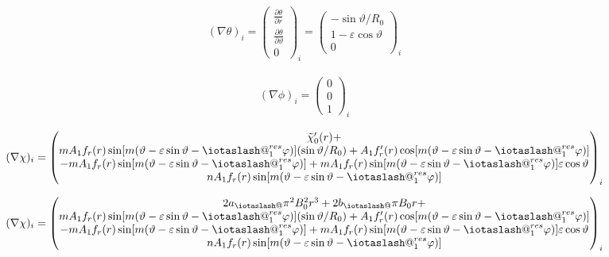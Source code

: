 \documentclass[11pt,a4paper,oneside]{article}
\makeatletter
\newcommand{\iotaslash}{{\mathpalette\iotaslash@\relax}}
\newcommand{\iotaslash@}[2]{
  \raisebox{-0.6\height}[0pt][0pt]{%
    \rotatebox[origin=Bl]{15}{$\m@th#1{\mkern-1mu\mathchar'26}$}%
  }%
  \mkern-9.5mu\nonscript\mkern-1mu
  \iota
  \mkern1mu
}
\makeatother
\begin{document}
\begin{align}
(\nabla \theta)_i = \begin{pmatrix}\frac{\partial \theta}{\partial r}\\\frac{\partial \theta}{\partial \vartheta}\\0\end{pmatrix}_i=\begin{pmatrix}- \sin{\vartheta}/R_0\\1-\varepsilon \cos{\vartheta}\\0\end{pmatrix}_i
\end{align}

\begin{align}
(\nabla \phi)_i = \begin{pmatrix}0\\0\\1\end{pmatrix}_i
\end{align}

\begin{align}
(\nabla \chi)_i=\begin{pmatrix}\tilde{\chi}_0'(r)+\\
mA_1f_r(r)\sin[m(\vartheta-\varepsilon \sin{\vartheta}-\iotaslash^{res}_1\varphi)](\sin{\vartheta}/R_0)+A_1f_r'(r)\cos[m(\vartheta-\varepsilon \sin{\vartheta}-\iotaslash^{res}_1\varphi)]\\-mA_1f_r(r)\sin[m(\vartheta-\varepsilon \sin{\vartheta}-\iotaslash^{res}_1\varphi)]+mA_1f_r(r)\sin[m(\vartheta-\varepsilon \sin{\vartheta}-\iotaslash^{res}_1\varphi)]\varepsilon\cos{\vartheta}\\nA_1f_r(r)\sin[m(\vartheta-\varepsilon \sin{\vartheta}-\iotaslash^{res}_1\varphi)]\end{pmatrix}_i
\end{align}

\begin{align}
(\nabla \chi)_i=\begin{pmatrix}2a_\iotaslash\pi^2 B_0^2 r^3+2b_\iotaslash\pi B_0 r+\\
mA_1f_r(r)\sin[m(\vartheta-\varepsilon \sin{\vartheta}-\iotaslash^{res}_1\varphi)](\sin{\vartheta}/R_0)+A_1f_r'(r)\cos[m(\vartheta-\varepsilon \sin{\vartheta}-\iotaslash^{res}_1\varphi)]\\-mA_1f_r(r)\sin[m(\vartheta-\varepsilon \sin{\vartheta}-\iotaslash^{res}_1\varphi)]+mA_1f_r(r)\sin[m(\vartheta-\varepsilon \sin{\vartheta}-\iotaslash^{res}_1\varphi)]\varepsilon\cos{\vartheta}\\nA_1f_r(r)\sin[m(\vartheta-\varepsilon \sin{\vartheta}-\iotaslash^{res}_1\varphi)]\end{pmatrix}_i
\end{align}
\end{document}

